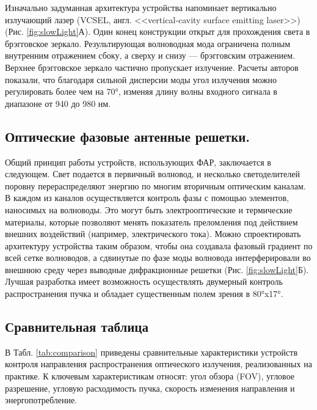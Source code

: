 Изначально задуманная архитектура устройства напоминает вертикально излучающий лазер (VCSEL, англ. <<vertical-cavity surface emitting laser>>) (Рис. \ref{fig:slowLight}А). Один конец конструкции открыт для прохождения света в брэгговское зеркало. Результирующая волноводная мода ограничена полным внутренним отражением сбоку, а сверху и снизу --- брэгговским отражением. Верхнее брэгговское зеркало частично пропускает излучение. Расчеты авторов показали, что благодаря сильной дисперсии моды угол излучения можно регулировать более чем на 70°, изменяя длину волны входного сигнала в диапазоне от 940 до 980 нм.


\subsection{Оптические фазовые антенные решетки.}
Общий принцип работы устройств, использующих ФАР, заключается в следующем. Свет подается в первичный волновод, и несколько светоделителей поровну перераспределяют энергию по многим вторичным оптическим каналам. В каждом из каналов осуществляется контроль фазы с помощью элементов, наносимых на волноводы. Это могут быть электрооптические и термические материалы, которые позволяют менять показатель преломления под действием внешних воздействий (например, электрического тока). Можно спроектировать архитектуру устройства таким образом, чтобы она создавала фазовый градиент по всей сетке волноводов, а сдвинутые по фазе моды волновода интерферировали во внешнюю среду через выводные дифракционные решетки (Рис. \ref{fig:slowLight}Б). Лучшая разработка имеет возможность осуществлять двумерный контроль распространения пучка и обладает существенным полем зрения в 80°x17°\cite{hutchison2016high}.

\subsection{Сравнительная таблица}
В Табл. \ref{tab:comparison} приведены сравнительные характеристики устройств контроля направления распространения оптического излучения, реализованных на практике. К ключевым характеристикам относят: угол обзора (FOV), угловое разрешение, угловую расходимость пучка, скорость изменения направления и энергопотребление.

